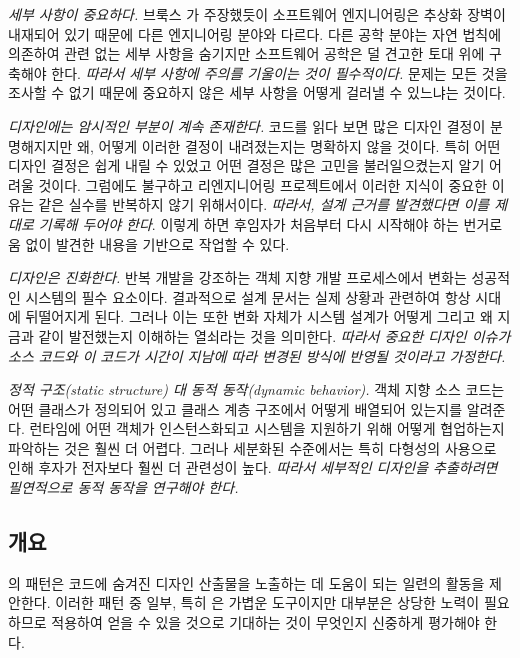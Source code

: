 \documentclass[a4paper,10pt,twoside]{book}
\begin{document}
\begin{bulletlist}
\item \emph{세부 사항이 중요하다.}
브룩스 \cite{Broo87a}가 주장했듯이 소프트웨어 엔지니어링은 추상화 장벽이 내재되어 있기 때문에 다른 엔지니어링 분야와 다르다. 다른 공학 분야는 자연 법칙에 의존하여 관련 없는 세부 사항을 숨기지만 소프트웨어 공학은 덜 견고한 토대 위에 구축해야 한다. \emph{따라서 세부 사항에 주의를 기울이는 것이 필수적이다.} 문제는 모든 것을 조사할 수 없기 때문에 중요하지 않은 세부 사항을 어떻게 걸러낼 수 있느냐는 것이다.

\item \emph{디자인에는 암시적인 부분이 계속 존재한다.}
코드를 읽다 보면 많은 디자인 결정이 분명해지지만 왜, 어떻게 이러한 결정이 내려졌는지는 명확하지 않을 것이다. 특히 어떤 디자인 결정은 쉽게 내릴 수 있었고 어떤 결정은 많은 고민을 불러일으켰는지 알기 어려울 것이다. 그럼에도 불구하고 리엔지니어링 프로젝트에서 이러한 지식이 중요한 이유는 같은 실수를 반복하지 않기 위해서이다. \emph{따라서, 설계 근거를 발견했다면 이를 제대로 기록해 두어야 한다}. 이렇게 하면 후임자가 처음부터 다시 시작해야 하는 번거로움 없이 발견한 내용을 기반으로 작업할 수 있다.

\item \emph{디자인은 진화한다.}
반복 개발을 강조하는 객체 지향 개발 프로세스에서 변화는 성공적인 시스템의 필수 요소이다. 결과적으로 설계 문서는 실제 상황과 관련하여 항상 시대에 뒤떨어지게 된다. 그러나 이는 또한 변화 자체가 시스템 설계가 어떻게 그리고 왜 지금과 같이 발전했는지 이해하는 열쇠라는 것을 의미한다. \emph{따라서 중요한 디자인 이슈가 소스 코드와 이 코드가 시간이 지남에 따라 변경된 방식에 반영될 것이라고 가정한다.}

\item \emph{정적 구조(static structure) 대 동적 동작(dynamic behavior).}
객체 지향 소스 코드는 어떤 클래스가 정의되어 있고 클래스 계층 구조에서 어떻게 배열되어 있는지를 알려준다. 런타임에 어떤 객체가 인스턴스화되고 시스템을 지원하기 위해 어떻게 협업하는지 파악하는 것은 훨씬 더 어렵다. 그러나 세분화된 수준에서는 특히 다형성의 사용으로 인해 후자가 전자보다 훨씬 더 관련성이 높다. \emph{따라서 세부적인 디자인을 추출하려면 필연적으로 동적 동작을 연구해야 한다.}
\end{bulletlist}

\subsection*{개요}

의 패턴은 코드에 숨겨진 디자인 산출물을 노출하는 데 도움이 되는 일련의 활동을 제안한다. 이러한 패턴 중 일부, 특히 은 가볍운 도구이지만 대부분은 상당한 노력이 필요하므로 적용하여 얻을 수 있을 것으로 기대하는 것이 무엇인지 신중하게 평가해야 한다.
\end{document}
